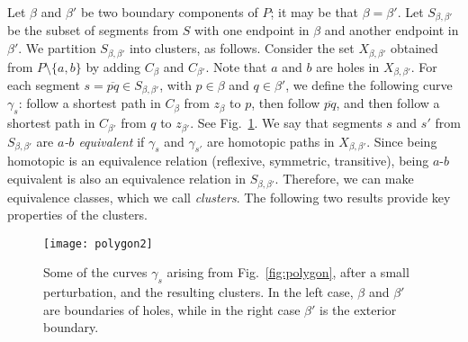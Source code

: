 \documentclass[11pt,a4paper]{article}
\newcommand\segment[1]{\ensuremath{\overline{#1}}}
\begin{document}
Let $\beta$ and $\beta'$ be two boundary components of $P$; it may be that $\beta=\beta'$. 
Let $S_{\beta,\beta'}$ be the subset of segments from $S$ with one endpoint in $\beta$ and another endpoint in $\beta'$. We partition $S_{\beta,\beta'}$ into clusters, as follows. Consider the set $X_{\beta,\beta'}$ obtained from $P\setminus \{ a, b \}$ by adding $C_\beta$ and $C_{\beta'}$. Note that $a$ and $b$ are holes in $X_{\beta,\beta'}$. For each segment $s=\segment{pq}\in S_{\beta,\beta'}$, with $p\in \beta$ and $q\in\beta'$, we define the following
curve $\gamma_s$: follow a shortest path in $C_\beta$ from $z_\beta$ to $p$, then follow $\segment{pq}$, and then follow a shortest path
in $C_{\beta'}$ from $q$ to $z_{\beta'}$. See Fig.~\ref{fig:polygon2}.
We say that segments $s$ and $s'$ from $S_{\beta,\beta'}$ are \emph{$a$-$b$ equivalent} if $\gamma_s$ and $\gamma_{s'}$ are homotopic paths in $X_{\beta,\beta'}$.
Since being homotopic is an equivalence relation (reflexive, symmetric, transitive), being $a$-$b$ equivalent is also an equivalence relation in $S_{\beta,\beta'}$.
Therefore, we can make equivalence classes, which we call \emph{clusters}. 
The following two results provide key properties of the clusters. 

\begin{figure}[t]
\centering
\texttt{[image: polygon2]}
\caption{Some of the curves $\gamma_s$ arising from Fig.~\ref{fig:polygon}, after a small perturbation, and the resulting clusters. In the left case, $\beta$ and $\beta'$ are boundaries of holes, while in the right case $\beta'$ is the exterior boundary.}
\label{fig:polygon2}
\end{figure}
\end{document}
